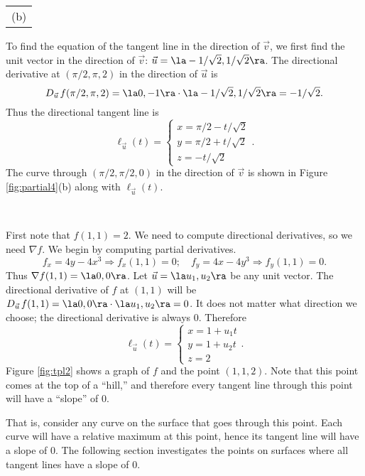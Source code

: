 {{\begin{tabular}{c}
(b)
\end{tabular}
}
To find the equation of the tangent line in the direction of $\vec v$, we first find the unit vector in the direction of $\vec v$: $\vec u = \la -1/\sqrt{2},1/\sqrt{2}\ra$. The directional derivative at $(\pi/2,\pi,2)$ in the direction of $\vec u$ is 
$$D_{\vec u\,}f(\pi/2,\pi,2) = \la 0,-1\ra \cdot \la -1/\sqrt{2},1/\sqrt 2\ra = -1/\sqrt 2.$$
Thus the directional tangent line is 
$$\ell_{\vec u}(t) = \left\{\begin{array}{l} x= \pi/2 -t/\sqrt{2}\\ y = \pi/2 + t/\sqrt{2} \\ z= -t/\sqrt{2}\end{array}\right. .$$
The curve through $(\pi/2,\pi/2,0)$ in the direction of $\vec v$ is shown in Figure \ref{fig:partial4}(b) along with $\ell_{\vec u}(t)$.
}\\

{First note that $f(1,1) = 2$. We need to compute directional derivatives, so we need $\nabla f$. We begin by computing partial derivatives.
$$f_x = 4y-4x^3 \Rightarrow f_x(1,1) = 0;\quad f_y = 4x-4y^3\Rightarrow f_y(1,1) = 0.$$
Thus $\nabla f(1,1) = \la 0,0\ra$. Let $\vec u = \la u_1,u_2\ra$ be any unit vector. The directional derivative of $f$ at $(1,1)$ will be $D_{\vec u\,}f(1,1) = \la 0,0\ra\cdot \la u_1,u_2\ra = 0$. It does not matter what direction we choose; the directional derivative is always 0. Therefore
$$\ell_{\vec u}(t) = \left\{\begin{array}{l} x= 1 +u_1t\\ y = 1+ u_2 t\\ z= 2\end{array}\right..$$
Figure \ref{fig:tpl2} shows a graph of $f$ and the point $(1,1,2)$. Note that this point comes at the top of a ``hill,'' and therefore every tangent line through this point will have a ``slope'' of 0. 


That is, consider any curve on the surface that goes through this point. Each curve will have a relative maximum at this point, hence its tangent line will have a slope of 0. The following section investigates the points on surfaces where all tangent lines have a slope of 0.
}\\
\pagebreak

